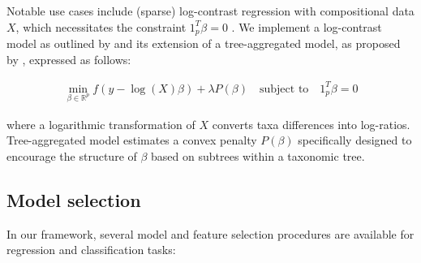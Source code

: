 \documentclass[10pt,a4paper]{article}
\let\cite\citep
\begin{document}



Notable use cases include (sparse) log-contrast regression with compositional data $X$, which necessitates the constraint $1^T_p \beta = 0$ \cite{aitchison1984log}. We implement a log-contrast model as outlined by \cite{combettes2020perspective} and its extension of a tree-aggregated model, as proposed by \cite{bien2021tree}, expressed as follows:

\begin{equation}\label{eq:slc}
    \begin{aligned}
        \min_{\beta \in \mathbb{R}^p} f(y - \log(X) \beta) + \lambda P (\beta)\quad \text{subject to} \quad 1_p^T \beta = 0
    \end{aligned}
\end{equation}


where a logarithmic transformation of $X$ converts taxa differences into log-ratios. Tree-aggregated model estimates a convex penalty \(P(\beta)\) specifically designed to encourage the structure of \(\beta\) based on subtrees within a taxonomic tree.



\subsection*{Model selection}
In our framework, several model and feature selection procedures are available for regression and classification tasks:
\end{document}
